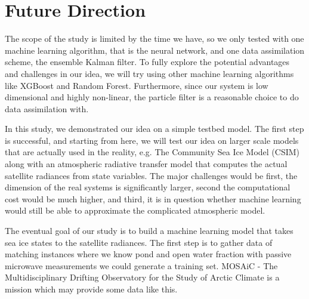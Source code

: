 \section{Future Direction}
\par The scope of the study is limited by the time we have, so we only tested with one machine learning algorithm, that is the neural network, and one data assimilation scheme, the ensemble Kalman filter. To fully explore the potential advantages and challenges in our idea, we will try using other machine learning algorithms like XGBoost and Random Forest. Furthermore, since our system is low dimensional and highly non-linear, the particle filter is a reasonable choice to do data assimilation with.
\par In this study, we demonstrated our idea on a simple testbed model. The first step is successful, and starting from here, we will test our idea on larger scale models that are actually used in the reality, e.g. The Community Sea Ice Model (CSIM) \cite{CICE} along with an atmospheric radiative transfer model that computes the actual satellite radiances from state variables.  The major challenges would be first, the dimension of the real systems is significantly larger, second the computational cost would be much higher, and third, it is in question whether machine learning would still be able to approximate the complicated atmospheric model.
\par The eventual goal of our study is to build a machine learning model that takes sea ice states to the satellite radiances. The first step is to gather data of matching instances where we know pond and open water fraction with passive microwave measurements we could generate a training set. MOSAiC - The Multidisciplinary Drifting Observatory for the Study of Arctic Climate is a mission which may provide some data like this.



